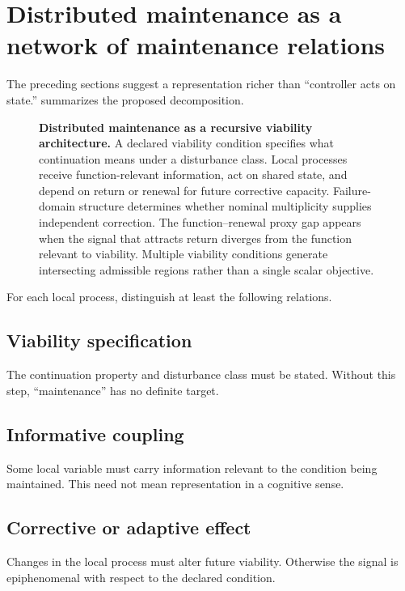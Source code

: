 \section{Distributed maintenance as a network of maintenance relations}

The preceding sections suggest a representation richer than ``controller acts on state.''  summarizes the proposed decomposition.

\begin{figure}[htbp]
\centering

\caption{\textbf{Distributed maintenance as a recursive viability architecture.}
A declared viability condition specifies what continuation means under a disturbance class. Local processes receive function-relevant information, act on shared state, and depend on return or renewal for future corrective capacity. Failure-domain structure determines whether nominal multiplicity supplies independent correction. The function--renewal proxy gap appears when the signal that attracts return diverges from the function relevant to viability. Multiple viability conditions generate intersecting admissible regions rather than a single scalar objective.}
\label{fig:maintenance}
\end{figure}

For each local process, distinguish at least the following relations.

\subsection{Viability specification}

The continuation property and disturbance class must be stated. Without this step, ``maintenance'' has no definite target.

\subsection{Informative coupling}

Some local variable must carry information relevant to the condition being maintained. This need not mean representation in a cognitive sense.

\subsection{Corrective or adaptive effect}

Changes in the local process must alter future viability. Otherwise the signal is epiphenomenal with respect to the declared condition.

